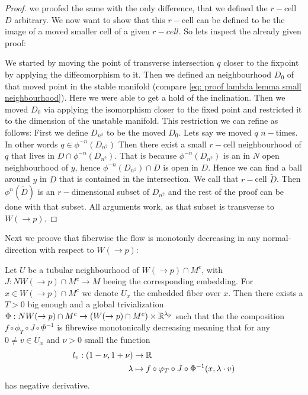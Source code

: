\begin{proof}
	we proofed the same with the only difference, that we defined the $r-$cell $D$ arbitrary. We now want to show that this $r-$cell can be defined to be the image of a moved smaller cell of a given $r-cell$. So lets inspect the already given proof:
	
	We started by moving the point of transverse intersection $q$ closer to the fixpoint by applying the diffeomorphism to it. Then we defined an neighbourhood $D_0$ of that moved point in the stable manifold (compare \ref{eq: proof lambda lemma small neighbourhood}). Here we were able to get a hold of the inclination. Then we moved $D_0$ via applying the isomorphism closer to the fixed point and restricted it to the dimension of the unstable manifold. This restriction we can refine as follows: First we define $D_{n^2}$ to be the moved $D_0$. Lets say we moved $q$ $n-$times. In other words $q\in \phi^{-n}(D_{n^2})$ Then there exist a small $r-$cell neighbourhood of $q$ that lives in $D \cap \phi^{-n}(D_{n^2})$. That is because $ \phi^{-n}(D_{n^2})$ is an in $N$ open neighbourhood of $y$, hence $\phi^{-n}(D_{n^2}) \cap D$ is open in $D$. Hence we can find a ball around $y$ in $D$ that is contained in the intersection. We call that $r-$cell $\tilde{D}$. Then $\phi^n(\tilde{D})$ is an $r-$dimensional subset of $D_{n^2}$ and the rest of the proof can be done with that subset. All arguments work, as that subset is transverse to $W(\to p)$. 
	
\end{proof}
Next we proove that fiberwise the flow is monotonly decreasing in any normal-direction with respect to $W(\to p)$:
\begin{lemma}\label{lem: fibrewise monotopnically}
	Let $U$ be a tubular neighbourhood of $W(\to p)\cap M^c$, with $J:NW(\to p)\cap M^c\to M$ beeing the corresponding embedding. For $x\in W(\to p)\cap M^c$ we denote $U_x$ the embedded fiber over $x$. Then there exists a $T>0$ big enough and a global trivialization $\Phi: NW(\to p)\cap M^c\to  \left(W(\to p)\cap M^c\right)\times \mathbb{R}^{\lambda_p}$ such that the the composition $f\circ \phi_T \circ J\circ \Phi^{-1}$ is fibrewise monotonically decreasing meaning that for any  $0\neq v\in U_x$  and $\nu >0 $ small the function
	\begin{align*}
		l_v: (1-\nu,1+\nu) &\to \mathbb{R}\\
		\lambda &\mapsto f\circ \varphi_T \circ J\circ \Phi^{-1}(x,\lambda \cdot v)
	\end{align*} has negative derivative.
\end{lemma}
